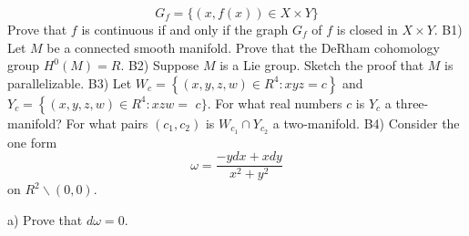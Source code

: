 \documentclass[10pt]{article}
\begin{document}
$$
G_{f}=\{(x, f(x)) \in X \times Y\}
$$
Prove that $f$ is continuous if and only if the graph $G_{f}$ of $f$ is closed in $X \times Y$.
\newpage
B1) Let $M$ be a connected smooth manifold. Prove that the DeRham cohomology group $H^{0}(M)=R$.
\newpage
B2) Suppose $M$ is a Lie group. Sketch the proof that $M$ is parallelizable.
\newpage
B3) Let $W_{c}=\left\{(x, y, z, w) \in R^{4}: x y z=c\right\}$ and $Y_{c}=\left\{(x, y, z, w) \in R^{4}: x z w=\right.$ $c\}$. For what real numbers $c$ is $Y_{c}$ a three-manifold? For what pairs $\left(c_{1}, c_{2}\right)$ is $W_{c_{1}} \cap Y_{c_{2}}$ a two-manifold.
\newpage
B4) Consider the one form
$$
\omega=\frac{-y d x+x d y}{x^{2}+y^{2}}
$$
on $R^{2} \backslash(0,0)$.

a) Prove that $d \omega=0$.
\end{document}
